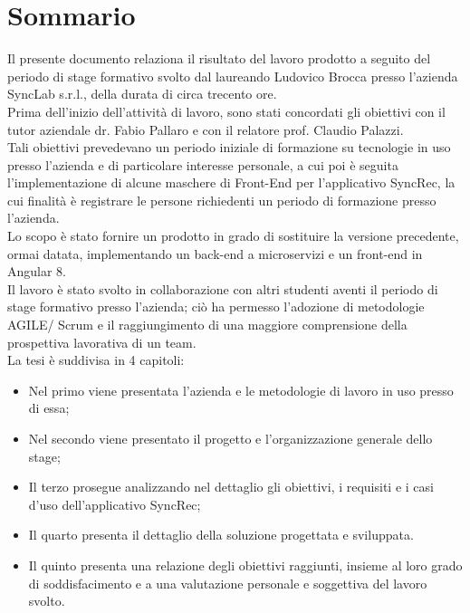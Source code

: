 
\cleardoublepage
{}
{}
\begingroup
\let\clearpage\relax
\let\cleardoublepage\relax
\let\cleardoublepage\relax

\chapter*{Sommario}

Il presente documento relaziona il risultato del lavoro prodotto a seguito del periodo di stage formativo svolto dal laureando Ludovico Brocca presso l'azienda SyncLab s.r.l., della durata di circa trecento ore.\\
Prima dell'inizio dell'attività di lavoro, sono stati concordati gli obiettivi con il tutor aziendale dr. Fabio Pallaro e con il relatore prof. Claudio Palazzi.\\
Tali obiettivi prevedevano un periodo iniziale di formazione su tecnologie in uso presso l'azienda e di particolare interesse personale, a cui poi è seguita l'implementazione di alcune maschere di Front-End per l'applicativo SyncRec, la cui finalità è registrare le persone richiedenti un periodo di formazione presso l'azienda.\\
Lo scopo è stato fornire un prodotto in grado di sostituire la versione precedente, ormai datata, implementando un back-end a microservizi e un front-end in Angular 8.\\
Il lavoro è stato svolto in collaborazione con altri studenti aventi il periodo di stage formativo presso l'azienda; ciò ha permesso l'adozione di metodologie AGILE/ Scrum e il raggiungimento di una maggiore comprensione della prospettiva lavorativa di un team.\\
La tesi è suddivisa in 4 capitoli:
\begin{itemize}
	\item Nel primo viene presentata l'azienda e le metodologie di lavoro in uso presso di essa;
	\item Nel secondo viene presentato il progetto e l'organizzazione generale dello stage;
	\item Il terzo prosegue analizzando nel dettaglio gli obiettivi, i requisiti e i casi d'uso dell'applicativo SyncRec; 
	\item Il quarto presenta il dettaglio della soluzione progettata e sviluppata.
	\item Il quinto presenta una relazione degli obiettivi raggiunti, insieme al loro grado di soddisfacimento e a una valutazione personale e soggettiva del lavoro svolto.
\end{itemize}
